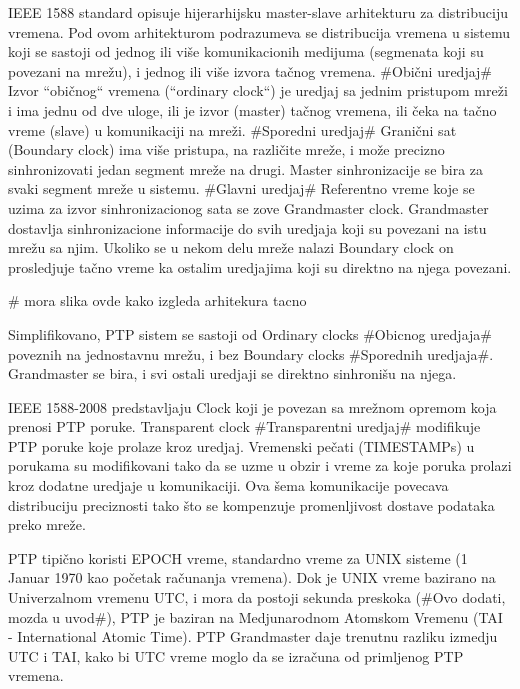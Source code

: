 \documentclass[a4paper,12pt, master]{etf}
\begin{document}
	IEEE 1588 standard opisuje hijerarhijsku master-slave arhitekturu za distribuciju vremena. 
	Pod	ovom arhitekturom podrazumeva se distribucija vremena u sistemu koji se sastoji od 
	jednog ili vi\v{s}e komunikacionih medijuma (segmenata koji su povezani na mre\v{z}u), i jednog 
    ili vi\v{s}e izvora	ta\v{c}nog vremena. \#Obi\v{c}ni uredjaj\# Izvor ``obi\v{c}nog`` vremena 
    (``ordinary clock``) je uredjaj sa jednim pristupom mre\v{z}i i ima jednu od dve uloge, ili je 
    izvor (master) ta\v{c}nog vremena, ili \v{c}eka na ta\v{c}no vreme (slave) u komunikaciji na 
    mre\v{z}i. \#Sporedni uredjaj\# Grani\v{c}ni sat (Boundary	clock) ima vi\v{s}e pristupa, na 
    razli\v{c}ite mre\v{z}e, i mo\v{z}e precizno sinhronizovati jedan segment mre\v{z}e na drugi. 
    Master sinhronizacije se bira za svaki segment mre\v{z}e u sistemu. \#Glavni uredjaj\# 
    Referentno vreme koje se uzima za izvor sinhronizacionog sata se zove Grandmaster clock. 
    Grandmaster dostavlja sinhronizacione informacije do svih uredjaja koji su povezani na istu 
    mre\v{z}u sa njim. Ukoliko se u nekom delu mre\v{z}e nalazi Boundary clock on prosledjuje 
    ta\v{c}no vreme ka ostalim uredjajima koji su direktno na njega povezani.

	\# mora slika ovde kako izgleda arhitekura tacno

	Simplifikovano, PTP sistem se sastoji od Ordinary clocks \#Obicnog uredjaja\# poveznih na
	jednostavnu mre\v{z}u, i bez Boundary clocks \#Sporednih uredjaja\#. Grandmaster se bira, i svi
	ostali uredjaji se direktno sinhroni\v{s}u na njega.

	IEEE 1588-2008 predstavljaju Clock koji je povezan sa mre\v{z}nom opremom koja prenosi PTP 
	poruke.	Transparent clock \#Transparentni uredjaj\# modifikuje PTP poruke koje prolaze 
	kroz uredjaj. Vremenski pe\v{c}ati (TIMESTAMPs) u porukama su modifikovani tako da se uzme u 
	obzir i vreme za koje poruka prolazi kroz dodatne uredjaje u komunikaciji. Ova \v{s}ema 
	komunikacije povecava distribuciju preciznosti tako \v{s}to se kompenzuje promenljivost 
	dostave podataka preko mre\v{z}e.

	PTP tipi\v{c}no koristi EPOCH vreme, standardno vreme za UNIX sisteme (1 Januar 1970 kao 
    po\v{c}etak	ra\v{c}unanja vremena). Dok je UNIX vreme bazirano na Univerzalnom vremenu UTC, 
    i mora da postoji sekunda preskoka (\#Ovo dodati, mozda u uvod\#), PTP je baziran na 
	Medjunarodnom Atomskom Vremenu (TAI - International Atomic Time). PTP Grandmaster daje 
	trenutnu razliku izmedju UTC i TAI,	kako bi UTC vreme moglo da se izra\v{c}una od primljenog 
	PTP vremena.
\end{document}
